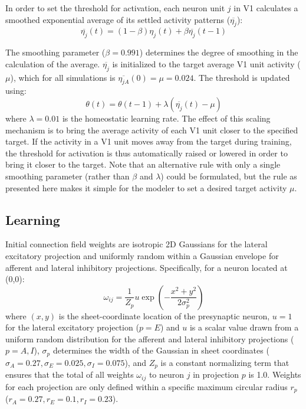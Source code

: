 In order to set the threshold for activation, each neuron unit $j$ in V1
calculates a smoothed exponential average of its settled
  activity patterns ($\overline{\eta_{j}}$):
\begin{equation}
\overline{\eta_{j}}(t)= (1-\beta)\eta_{j}(t) + \beta\overline{\eta_{j}}(t-1)
\label{eqn:averaging}
\end{equation}

The smoothing parameter ($\beta=0.991$) determines the degree of
smoothing in the calculation of the average. $\overline{\eta_{j}}$ is
initialized to the target average V1 unit activity ($\mu$), which for
all simulations is $\overline{\eta_{jA}}(0) = \mu= 0.024$. The
threshold is updated using:
\begin{equation}
\label{eqn:thresholdupdate}%
\theta(t)= \theta(t-1) + \lambda(\overline{\eta_{j}}(t) -\mu)
\end{equation}
where $\lambda=0.01$ is the homeostatic learning rate. The effect of
this scaling mechanism is to bring the average activity of each V1
unit closer to the specified target. If the activity in a V1 unit
moves away from the target during training, the threshold for
activation is thus automatically raised or lowered in order to bring
it closer to the target. Note that an alternative rule with only a
single smoothing parameter (rather than $\beta$ and $\lambda$) could
be formulated, but the rule as presented here makes it simple for the
modeler to set a desired target activity $\mu$.

\subsection*{Learning}

Initial connection field weights are isotropic 2D Gaussians for the
lateral excitatory projection and uniformly random within a Gaussian envelope
for afferent and lateral inhibitory projections. Specifically, for a
neuron located at (0,0):
\begin{equation}
\omega_{ij}=\frac{1}{Z_p}u\exp\left(-\frac{x^{2}+y^{2}}{2\sigma_{p}^{2}}\right)
\label{eqn:gaussrandomweights}
\end{equation}
where $(x, y)$ is the sheet-coordinate location of the presynaptic
neuron, $u=1$ for the lateral excitatory projection ($p=E$) and $u$ is
a scalar value drawn from a uniform random distribution for the
afferent and lateral inhibitory projections ($p=A,I$), $\sigma_{p}$
determines the width of the Gaussian in sheet coordinates
($ \sigma_{A}=0.27, \sigma_{E}=0.025, \sigma_{I}=0.075$), and $Z_p$ is
a constant normalizing term that
ensures that the total of all weights $\omega_{ij}$ to neuron $j$ in
projection $p$ is 1.0.  Weights for
each projection are only defined within a specific maximum circular
radius $r_p$ ($r_{A}=0.27, r_{E}=0.1, r_{I}=0.23$).

